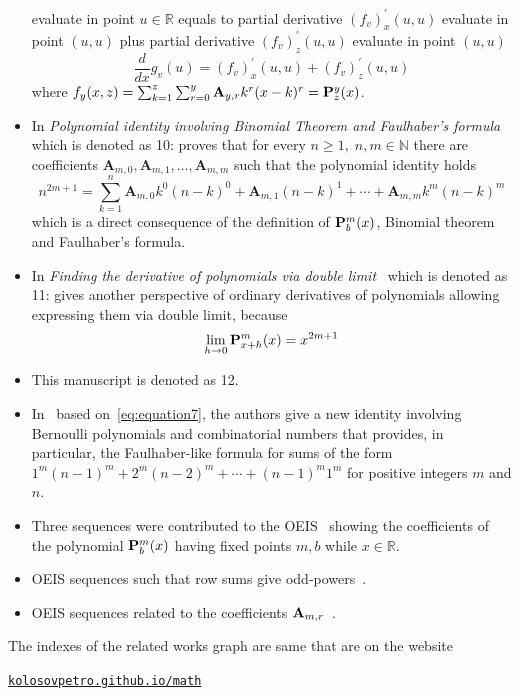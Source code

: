 \begin{itemize}
    evaluate in point $u\in\mathbb{R}$ equals to partial derivative $(f_{v})^{'}_{x} (u, u)$ evaluate in point $(u, u)$ plus
    partial derivative $(f_{v})^{'}_{z} (u, u)$ evaluate in point $(u, u)$
    \begin{equation}
        \frac{d}{dx} g_v (u) = (f_{v})^{'}_{x} (u, u) + (f_{v})^{'}_{z} (u, u)
        \label{eq:odd-exponential-identity}
    \end{equation}
    where $f_{y} (x, z) = \sum_{k=1}^{z} \sum_{r=0}^{y} {\mathbf{A}} \sb{y,r} k^r (x-k)^r = {\mathbf{P}}\sp{y} \sb{z}(x)$.
    \item In \textit{Polynomial identity involving Binomial Theorem and Faulhaber's formula}~\cite{kolosov2023polynomial}
    which is denoted as 10: proves that
    for every $n\geq 1, \; n,m\in\mathbb{N}$
    there are coefficients $\mathbf{A}_{m,0}, \mathbf{A}_{m,1}, \ldots, \mathbf{A}_{m,m}$ such that
    the polynomial identity holds
    \[
        n^{2m+1} = \sum_{k=1}^{n} \mathbf{A}_{m,0} k^0 (n-k)^0 + \mathbf{A}_{m,1}(n-k)^1
        + \cdots + \mathbf{A}_{m,m} k^m (n-k)^m
    \]
    which is a direct consequence of the definition of ${\mathbf{P}}\sp{m} \sb{b}(x)$, Binomial theorem and Faulhaber's formula.
    \item In \textit{Finding the derivative of polynomials via double limit}~\cite{kolosov_2024_10575485}
    which is denoted as 11: gives another perspective of ordinary derivatives of polynomials allowing expressing
    them via double limit, because
    \begin{align*}
        \lim_{h \to 0} {\mathbf{P}}\sp{m} \sb{x+h}(x) = x^{2m+1}
    \end{align*}
    \item This manuscript is denoted as 12.
    \item In~\cite{barbero2020two} based on~\eqref{eq:equation7}, the authors give a new identity involving
    Bernoulli polynomials and combinatorial numbers that provides,
    in particular, the Faulhaber-like formula for sums of the form $1^m(n-1)^m + 2^m (n -2)^m + \cdots + (n - 1)^m 1^m$
    for positive integers $m$ and $n$.
    \item Three sequences were contributed to the
    OEIS~\cite{kolosov2018coefficientspolynomial1, kolosov2018coefficientspolynomial2, kolosov2018coefficientspolynomial3}
    showing the coefficients of the polynomial ${\mathbf{P}}\sp{m} \sb{b}(x)$ having fixed points $m,b$ while $x\in\mathbb{R}$.
    \item OEIS sequences such that row sums give odd-powers~\cite{kolosov2017third, kolosov2018fifth, kolosov2018seventh}.
    \item OEIS sequences related to the coefficients ${\mathbf{A}} \sb{m,r}$~\cite{kolosov2018numerator, kolosov2018denominator}.
\end{itemize}
The indexes of the related works graph are same that are on the website
\begin{center}
    \href{https://kolosovpetro.github.io/math/}{\texttt{kolosovpetro.github.io/math}}
\end{center}
